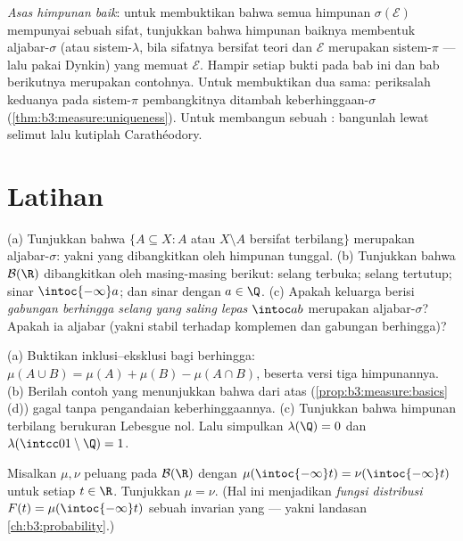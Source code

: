 \begin{method}\label{met:b3:measure:goodsets}
\emph{Asas himpunan baik}: untuk membuktikan bahwa semua himpunan
$\sigma(\mathcal E)$ mempunyai sebuah sifat, tunjukkan bahwa himpunan baiknya
membentuk aljabar-$\sigma$ (atau sistem-$\lambda$, bila sifatnya
bersifat teori  dan $\mathcal E$ merupakan sistem-$\pi$ ---
lalu pakai Dynkin) yang memuat $\mathcal E$. Hampir setiap bukti pada
bab ini dan bab berikutnya merupakan contohnya. Untuk membuktikan dua 
sama: periksalah keduanya pada sistem-$\pi$ pembangkitnya ditambah
keberhinggaan-$\sigma$ (\cref{thm:b3:measure:uniqueness}). Untuk
membangun sebuah : bangunlah  lewat selimut lalu kutiplah
Carathéodory.
\end{method}

\section{Latihan}

\begin{exercise}[$\star$]\label{exo:b3:measure:1}
(a) Tunjukkan bahwa $\{A \subseteq X : A$ atau $X\setminus A$ bersifat
terbilang$\}$ merupakan aljabar-$\sigma$: yakni yang dibangkitkan oleh
himpunan tunggal.
(b) Tunjukkan bahwa $\mathcal B(\R)$ dibangkitkan oleh masing-masing berikut: selang
terbuka; selang tertutup; sinar $\intoc{-\infty}a$; dan sinar
dengan $a \in \Q$.
(c) Apakah keluarga berisi \emph{gabungan berhingga selang yang saling lepas}
$\intoc ab$ merupakan aljabar-$\sigma$? Apakah ia aljabar (yakni stabil terhadap
komplemen dan gabungan berhingga)?
\end{exercise}

\begin{exercise}[$\star$]\label{exo:b3:measure:2}
(a) Buktikan inklusi--eksklusi bagi  berhingga: $\mu(A\cup
B) = \mu(A) + \mu(B) - \mu(A\cap B)$, beserta versi
tiga himpunannya.
(b) Berilah contoh yang menunjukkan bahwa  dari atas
(\cref{prop:b3:measure:basics}(d)) gagal tanpa
pengandaian keberhinggaannya.
(c) Tunjukkan bahwa himpunan terbilang berukuran Lebesgue nol.
Lalu simpulkan $\lambda(\Q) = 0$ dan $\lambda(\intcc01\setminus\Q) =
1$.
\end{exercise}

\begin{exercise}[$\star\star$]\label{exo:b3:measure:3}
Misalkan $\mu, \nu$  peluang pada $\mathcal B(\R)$
dengan $\mu(\intoc{-\infty}t) = \nu(\intoc{-\infty}t)$ untuk setiap
$t \in \R$. Tunjukkan $\mu = \nu$. (Hal ini menjadikan
\emph{fungsi distribusi} $F(t) = \mu(\intoc{-\infty}t)$ sebuah
invarian yang  --- yakni landasan
\cref{ch:b3:probability}.)
\end{exercise}

